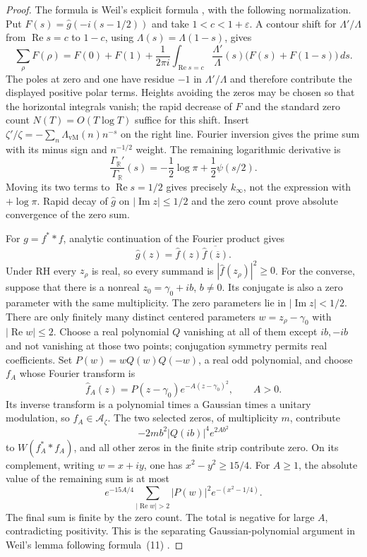 \begin{proof}
The formula is Weil's explicit formula
\cite[formula~(11), p.~262]{syn-arith:Weil}, with the following normalization.
Put $F(s)=\widehat g(-i(s-1/2))$ and take $1<c<1+\varepsilon$.
A contour shift for $\Lambda'/\Lambda$ from $\operatorname{Re}s=c$ to
$1-c$, using $\Lambda(s)=\Lambda(1-s)$, gives
\[
 \sum_\rho F(\rho)=F(0)+F(1)
 +\frac1{2\pi i}\int_{\operatorname{Re}s=c}
       \frac{\Lambda'}{\Lambda}(s)\bigl(F(s)+F(1-s)\bigr)\,ds.
\]
The poles at zero and one have residue $-1$ in $\Lambda'/\Lambda$ and
therefore contribute the displayed positive polar terms.
Heights avoiding the zeros may be chosen so that the horizontal integrals
vanish; the rapid decrease of $F$ and the standard zero count
$N(T)=O(T\log T)$ suffice for this shift.
Insert $\zeta'/\zeta=-\sum_n\Lambda_{\mathrm{vM}}(n)n^{-s}$ on the right
line.  Fourier inversion gives the prime sum with its minus sign and
$n^{-1/2}$ weight.  The remaining logarithmic derivative is
\[
 \frac{\Gamma_{\mathbb R}'}{\Gamma_{\mathbb R}}(s)
 =-\frac12\log\pi+\frac12\psi(s/2).
\]
Moving its two terms to $\operatorname{Re}s=1/2$ gives precisely
$k_\infty$, not the expression with $+\log\pi$.
Rapid decay of $\widehat g$ on $|\operatorname{Im}z|\leq1/2$ and the zero
count prove absolute convergence of the zero sum.

For $g=f^**f$, analytic continuation of the Fourier product gives
\[
 \widehat g(z)=\widehat f(z)\overline{\widehat f(\overline z)}.
\]
Under RH every $z_\rho$ is real, so every summand is
$|\widehat f(z_\rho)|^2\geq0$.
For the converse, suppose that there is a nonreal $z_0=\gamma_0+ib$,
$b\ne0$.  Its conjugate is also a zero parameter with the same multiplicity.
The zero parameters lie in $|\operatorname{Im}z|<1/2$.
There are only finitely many distinct centered parameters
$w=z_\rho-\gamma_0$ with $|\operatorname{Re}w|\leq2$.
Choose a real polynomial $Q$ vanishing at all of them except $ib,-ib$ and
not vanishing at those two points; conjugation symmetry permits real
coefficients.  Set $P(w)=wQ(w)Q(-w)$, a real odd polynomial, and choose $f_A$
whose Fourier transform is
\[
 \widehat f_A(z)=P(z-\gamma_0)e^{-A(z-\gamma_0)^2},\qquad A>0.
\]
Its inverse transform is a polynomial times a Gaussian times a unitary
modulation, so $f_A\in\mathcal A_\zeta$.
The two selected zeros, of multiplicity $m$, contribute
\[
 -2m b^2|Q(ib)|^4e^{2Ab^2}
\]
to $W(f_A^**f_A)$, and all other zeros in the finite strip contribute zero.
On its complement, writing $w=x+iy$, one has
$x^2-y^2\geq15/4$.  For $A\geq1$, the absolute value of the remaining sum
is at most
\[
 e^{-15A/4}\sum_{|\operatorname{Re}w|>2}|P(w)|^2e^{-(x^2-1/4)}.
\]
The final sum is finite by the zero count.  The total is negative for large
$A$, contradicting positivity.  This is the separating Gaussian-polynomial
argument in Weil's lemma following formula~(11)
\cite[pp.~262--263]{syn-arith:Weil}.
\end{proof}

